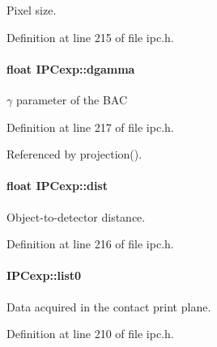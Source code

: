 Pixel size. 



Definition at line 215 of file ipc.h.

\hypertarget{classIPCexp_ad58a19e293a3d6aeb46ec7c9b5d7ac3d}{
\paragraph[{dgamma}]{\setlength{\rightskip}{0pt plus 5cm}float {\bf IPCexp::dgamma}}\hfill}
\label{classIPCexp_ad58a19e293a3d6aeb46ec7c9b5d7ac3d}


$\gamma$ parameter of the BAC 



Definition at line 217 of file ipc.h.



Referenced by projection().

\hypertarget{classIPCexp_ad564518ff232c38ac771849736022fd1}{
\paragraph[{dist}]{\setlength{\rightskip}{0pt plus 5cm}float {\bf IPCexp::dist}}\hfill}
\label{classIPCexp_ad564518ff232c38ac771849736022fd1}


Object-\/to-\/detector distance. 



Definition at line 216 of file ipc.h.

\hypertarget{classIPCexp_ae4dd5b05e0043fced323a7c82482241b}{
\paragraph[{list0}]{ {\bf IPCexp::list0}}\hfill}
\label{classIPCexp_ae4dd5b05e0043fced323a7c82482241b}


Data acquired in the contact print plane. 



Definition at line 210 of file ipc.h.



